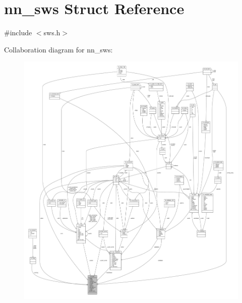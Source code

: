 \hypertarget{structnn__sws}{}\section{nn\+\_\+sws Struct Reference}
\label{structnn__sws}


{\ttfamily \#include $<$sws.\+h$>$}



Collaboration diagram for nn\+\_\+sws\+:\nopagebreak
\begin{figure}[H]
\begin{center}
\leavevmode
\includegraphics[width=350pt]{structnn__sws__coll__graph}
\end{center}
\end{figure}
